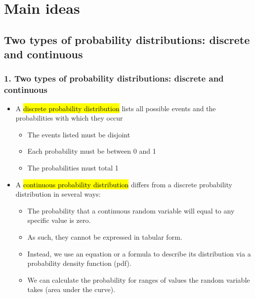 \documentclass[11pt,containsverbatim,handout,xcolor=xelatex,dvipsnames,table]{beamer}
\begin{document}

\section{Main ideas}


\subsection{Two types of probability distributions: discrete and continuous}
\label{mi1}


\begin{frame}
\frametitle{1. Two types of probability distributions: discrete and continuous}

\begin{itemize}

\item A \hl{discrete probability distribution} lists all possible events and the probabilities with 
which they occur
\begin{itemize}
\item The events listed must be disjoint
\item Each probability must be between 0 and 1 
\item The probabilities must total 1
\end{itemize}

\pause

\item A \hl{continuous probability distribution} differs from a discrete probability distribution in 
several ways:
\begin{itemize}
\item The probability that a continuous random variable will equal to any specific value is zero.
\item As such, they cannot be expressed in tabular form.
\item Instead, we use an equation or a formula to describe its distribution via a probability density 
function (pdf).
\item We can calculate the probability for ranges of values the random variable takes (area under 
the curve).
\end{itemize}

\end{itemize}

\end{frame}
\end{document}
